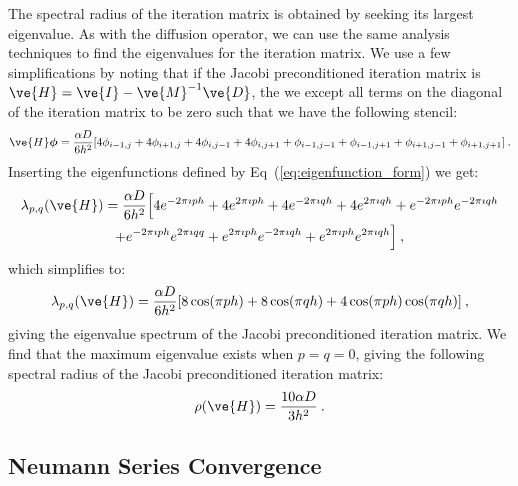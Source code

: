 \documentclass[preprint,11pt]{elsarticle}
\begin{document}
The spectral radius of the iteration matrix is obtained by seeking its largest
eigenvalue. As with the diffusion operator, we can use the same analysis
techniques to find the eigenvalues for the iteration matrix. We use a few
simplifications by noting that if the Jacobi preconditioned iteration matrix
is $\ve{H} = \ve{I} - \ve{M}^{-1}\ve{D}$, the we except all terms on the
diagonal of the iteration matrix to be zero such that we have the following
stencil:
\begin{equation}
  \ve{H}\boldsymbol{\phi} = \frac{\alpha D}{6h^2}[4 \phi_{i-1,j}
    + 4 \phi_{i+1,j} + 4 \phi_{i,j-1} + 4 \phi_{i,j+1} +
    \phi_{i-1,j-1} + \phi_{i-1,j+1} + \phi_{i+1,j-1} +
    \phi_{i+1,j+1}]\:.
  \label{eq:iteration_stencil}
\end{equation}
Inserting the eigenfunctions defined by Eq~(\ref{eq:eigenfunction_form}) we
get:
\begin{multline}
  \lambda_{p,q}(\ve{H}) = \frac{\alpha D}{6h^2}\Big[4 e^{-2 \pi \imath p
      h} + 4 e^{2 \pi \imath p h} + 4 e^{-2 \pi \imath q h} + 4 e^{2
      \pi \imath q h} + e^{-2 \pi \imath p h} e^{-2 \pi \imath q h}
    \\ + e^{-2 \pi \imath p h} e^{2 \pi \imath q q} + e^{2 \pi \imath
      p h} e^{-2 \pi \imath q h} + e^{2 \pi \imath p h} e^{2 \pi
      \imath q h}\Big]\:,
  \label{eq:iteration_deriv}
\end{multline}
which simplifies to:
\begin{equation}
  \lambda_{p,q}(\ve{H}) = \frac{\alpha D}{6h^2}[ 8 \cos(\pi p h) + 8
    \cos(\pi q h) + 4 \cos(\pi p h) \cos(\pi q h)]\:,
  \label{eq:iteration_spectrum}
\end{equation}
giving the eigenvalue spectrum of the Jacobi preconditioned iteration
matrix. We find that the maximum eigenvalue exists when $p=q=0$, giving the
following spectral radius of the Jacobi preconditioned iteration matrix:
\begin{equation}
  \rho(\ve{H}) = \frac{10 \alpha D}{3 h^2}\:.
  \label{eq:iteration_radius}
\end{equation}

\subsection{Neumann Series Convergence}
\label{subsec:neumann_convergence}
\end{document}
